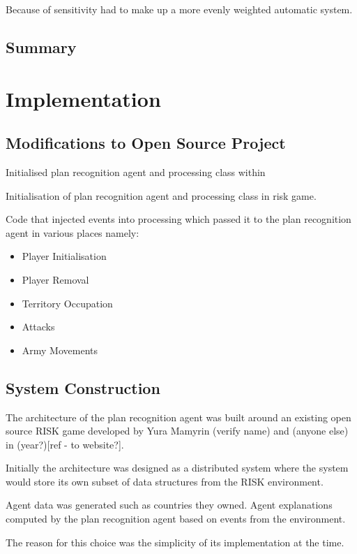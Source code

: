 \documentclass[parskip]{cs4rep}
\begin{document}
Because of sensitivity had to make up a more evenly weighted automatic system.

\subsection{Summary}

\section{Implementation}

\subsection{Modifications to Open Source Project}

Initialised plan recognition agent and processing class within 

Initialisation of plan recognition agent and processing class in risk game.

Code that injected events into processing which passed it to the plan recognition agent in various places namely:

\begin{itemize}
\item
Player Initialisation
\item
Player Removal
\item
Territory Occupation
\item
Attacks
\item
Army Movements
\end{itemize}

\subsection{System Construction}

The architecture of the plan recognition agent was built around an existing open source RISK game developed by Yura Mamyrin (verify name) and (anyone else) in (year?)[ref - to website?].

Initially the architecture was designed as a distributed system where the system would store its own subset of data structures from the RISK environment.

Agent data was generated such as countries they owned.
Agent explanations computed by the plan recognition agent based on events from the environment.

The reason for this choice was the simplicity of its implementation at the time.
\end{document}
